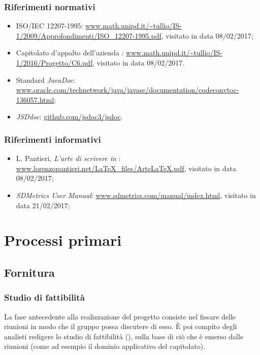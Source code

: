\subsubsection{Riferimenti normativi}
\begin{itemize}
	\item ISO/IEC 12207-1995: \url{www.math.unipd.it/\~tullio/IS-1/2009/Approfondimenti/ISO_12207-1995.pdf}, visitato in data 08/02/2017;
	\item Capitolato d'appalto dell'azienda \ZU: \url{www.math.unipd.it/~tullio/IS-1/2016/Progetto/C6.pdf}, visitato in data 08/02/2017. %
	\item Standard \emph{JavaDoc}: \url{www.oracle.com/technetwork/java/javase/documentation/codeconvtoc-136057.html};
	\item {} \emph{JSDdoc}: \url{github.com/jsdoc3/jsdoc}.
\end{itemize}

\subsubsection{Riferimenti informativi}
\begin{itemize}
	\item L. Pantieri, \emph{L'arte di scrivere in }: \url{www.lorenzopantieri.net/LaTeX_files/ArteLaTeX.pdf}, visitato in data 08/02/2017;
	\item \emph{SDMetrics User Manual}: \url{www.sdmetrics.com/manual/index.html}, visitato in data 21/02/2017;
\end{itemize}





\section{Processi primari} \label{sec:primari}

\subsection{Fornitura}

	\subsubsection{Studio di fattibilità}
	La fase antecedente alla realizzazione del progetto consiste nel fissare delle riunioni in modo che il gruppo possa discutere di esso. È poi compito degli analisti redigere lo studio di fattibilità (\SdF), sulla base di ciò che è emerso dalle riunioni (come ad esempio il dominio applicativo del capitolato).

